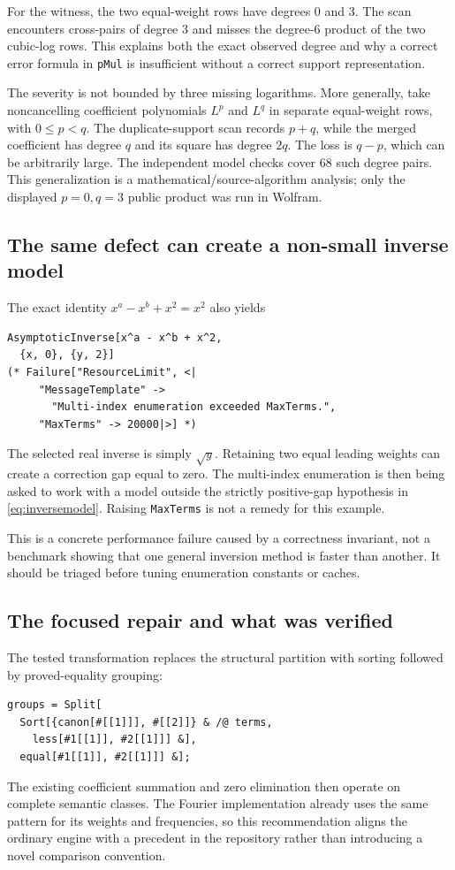 \documentclass[11pt,letterpaper]{article}
\newcommand{\code}[1]{{\small\nolinkurl{#1}}}
\begin{document}
For the witness, the two equal-weight rows have degrees $0$ and $3$. The scan encounters cross-pairs of degree $3$ and misses the degree-$6$ product of the two cubic-log rows. This explains both the exact observed degree and why a correct error formula in \code{pMul} is insufficient without a correct support representation.

The severity is not bounded by three missing logarithms. More generally, take noncancelling coefficient polynomials $L^p$ and $L^q$ in separate equal-weight rows, with $0\le p<q$. The duplicate-support scan records $p+q$, while the merged coefficient has degree $q$ and its square has degree $2q$. The loss is $q-p$, which can be arbitrarily large. The independent model checks cover 68 such degree pairs. This generalization is a mathematical/source-algorithm analysis; only the displayed $p=0,q=3$ public product was run in Wolfram.

\subsection{The same defect can create a non-small inverse model}
The exact identity $x^a-x^b+x^2=x^2$ also yields
\begin{lstlisting}
AsymptoticInverse[x^a - x^b + x^2,
  {x, 0}, {y, 2}]
(* Failure["ResourceLimit", <|
     "MessageTemplate" ->
       "Multi-index enumeration exceeded MaxTerms.",
     "MaxTerms" -> 20000|>] *)
\end{lstlisting}
The selected real inverse is simply $\sqrt y$. Retaining two equal leading weights can create a correction gap equal to zero. The multi-index enumeration is then being asked to work with a model outside the strictly positive-gap hypothesis in \eqref{eq:inversemodel}. Raising \code{MaxTerms} is not a remedy for this example.

This is a concrete performance failure caused by a correctness invariant, not a benchmark showing that one general inversion method is faster than another. It should be triaged before tuning enumeration constants or caches.

\subsection{The focused repair and what was verified}
The tested transformation replaces the structural partition with sorting followed by proved-equality grouping:
\begin{lstlisting}
groups = Split[
  Sort[{canon[#[[1]]], #[[2]]} & /@ terms,
    less[#1[[1]], #2[[1]]] &],
  equal[#1[[1]], #2[[1]]] &];
\end{lstlisting}
The existing coefficient summation and zero elimination then operate on complete semantic classes. The Fourier implementation already uses the same pattern for its weights and frequencies, so this recommendation aligns the ordinary engine with a precedent in the repository rather than introducing a novel comparison convention.\cite{fourier}
\end{document}
